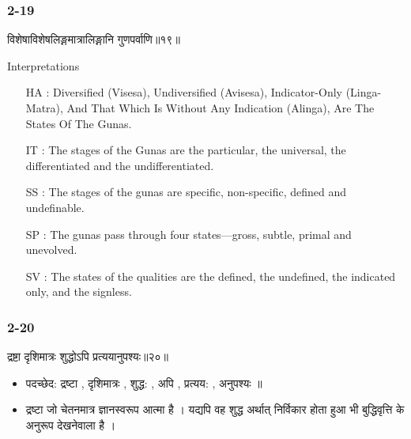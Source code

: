 \begin{frame}[fragile]\frametitle{2-19}
\begin{sanskrit}
विशेषाविशेषलिङ्गमात्रालिङ्गानि गुणपर्वाणि॥१९॥
\end{sanskrit}

Interpretations
\begin{itemize}
\item [HA]: Diversified (Visesa), Undiversified (Avisesa), Indicator-Only (Linga-Matra), And That Which Is Without Any Indication (Alinga), Are The States Of The Gunas.
\item [IT]: The stages of the Gunas are the particular, the universal, the differentiated and the undifferentiated.
\item [SS]: The stages of the gunas are specific, non-specific, defined and undefinable.
\item [SP]: The gunas pass through four states—gross, subtle, primal and unevolved.
\item [SV]: The states of the qualities are the defined, the undefined, the indicated only, and the signless. 
\end{itemize}
	
\end{frame}

\begin{frame}[fragile]\frametitle{2-20}
\begin{sanskrit}
द्रष्टा दृशिमात्रः शुद्धोऽपि प्रत्ययानुपश्यः॥२०॥
\end{sanskrit}

\begin{itemize}
\item पदच्छेद: द्रष्टा , दृशिमात्रः , शुद्ध: , अपि , प्रत्यय: , अनुपश्यः ॥
\item द्रष्टा जो चेतनमात्र ज्ञानस्वरूप आत्मा है । यद्यपि वह शुद्ध अर्थात् निर्विकार होता हुआ भी बुद्धिवृत्ति के अनुरूप देखनेवाला है ।
\end{itemize}
	
\end{frame}

